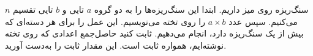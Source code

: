 \EXERCISE
$n$
سنگ‌ریزه روی میز داریم. ابتدا این سنگ‌ریزه‌ها را به دو گروه
$a$
تایی و
$b$
تایی تقسیم می‌کنیم. سپس عدد
$a \times b$
را روی تخته می‌نویسیم. این عمل را برای هر دسته‌ای که بیش از یک سنگ‌ریزه دارد، انجام می‌دهیم. ثابت کنید حاصل‌جمع اعدادی که روی تخته نوشته‌ایم، همواره ثابت است. این مقدار ثابت را به‌دست آورید.
